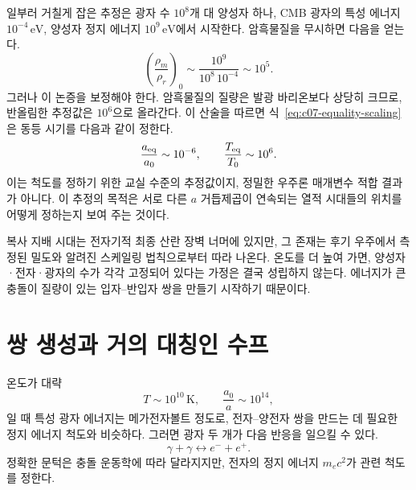 일부러 거칠게 잡은 추정은 광자 수 \(10^8\)개 대 양성자 하나, CMB 광자의 특성 에너지 \(10^{-4}\,\mathrm{eV}\), 양성자 정지 에너지 \(10^9\,\mathrm{eV}\)에서 시작한다. 암흑물질을 무시하면 다음을 얻는다.
\begin{equation}
\left(\frac{\rho_m}{\rho_r}\right)_0
\sim
\frac{10^9}{10^8\,10^{-4}}
\sim10^5.
\end{equation}
그러나 이 논증을 보정해야 한다. 암흑물질의 질량은 발광 바리온보다 상당히 크므로, 반올림한 추정값은 \(10^6\)으로 올라간다. 이 산술을 따르면 식~\eqref{eq:c07-equality-scaling}은 동등 시기를 다음과 같이 정한다.
\begin{equation}
\frac{a_{\rm eq}}{a_0}\sim10^{-6},
\qquad
\frac{T_{\rm eq}}{T_0}\sim10^6.
\label{eq:c07-equality-estimate}
\end{equation}
이는 척도를 정하기 위한 교실 수준의 추정값이지, 정밀한 우주론 매개변수 적합 결과가 아니다. 이 추정의 목적은 서로 다른 \(a\) 거듭제곱이 연속되는 열적 시대들의 위치를 어떻게 정하는지 보여 주는 것이다.

복사 지배 시대는 전자기적 최종 산란 장벽 너머에 있지만, 그 존재는 후기 우주에서 측정된 밀도와 알려진 스케일링 법칙으로부터 따라 나온다. 온도를 더 높여 가면, 양성자·전자·광자의 수가 각각 고정되어 있다는 가정은 결국 성립하지 않는다. 에너지가 큰 충돌이 질량이 있는 입자--반입자 쌍을 만들기 시작하기 때문이다.

\begin{classroomqa}
\end{classroomqa}

\section{쌍 생성과 거의 대칭인 수프}

온도가 대략
\begin{equation}
T\sim10^{10}\,\mathrm{K},
\qquad
\frac{a_0}{a}\sim10^{14},
\end{equation}
일 때 특성 광자 에너지는 메가전자볼트 정도로, 전자--양전자 쌍을 만드는 데 필요한 정지 에너지 척도와 비슷하다. 그러면 광자 두 개가 다음 반응을 일으킬 수 있다.
\begin{equation}
\gamma+\gamma
\longleftrightarrow
e^-+e^+.
\label{eq:c07-pair-reaction}
\end{equation}
정확한 문턱은 충돌 운동학에 따라 달라지지만, 전자의 정지 에너지 \(m_ec^2\)가 관련 척도를 정한다.

